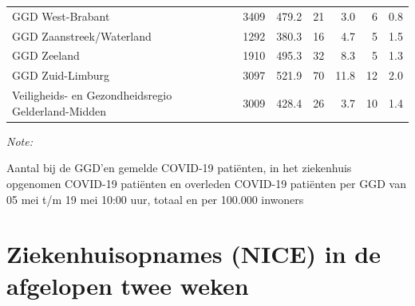 \documentclass[
  english,
  man,floatsintext]{apa6}
\begin{document}
\begin{table}
\begin{threeparttable}
\begin{tabular}{lrrrrrr}
GGD West-Brabant & 3409 & 479.2 & 21 & 3.0 & 6 & 0.8\\
GGD Zaanstreek/Waterland & 1292 & 380.3 & 16 & 4.7 & 5 & 1.5\\
GGD Zeeland & 1910 & 495.3 & 32 & 8.3 & 5 & 1.3\\
GGD Zuid-Limburg & 3097 & 521.9 & 70 & 11.8 & 12 & 2.0\\
Veiligheids- en Gezondheidsregio Gelderland-Midden & 3009 & 428.4 & 26 & 3.7 & 10 & 1.4\\
\bottomrule
\end{tabular}
\begin{tablenotes}
\item \textit{Note: } 
\item Aantal bij de GGD’en gemelde COVID-19 patiënten, in het ziekenhuis opgenomen COVID-19 patiënten en overleden COVID-19 patiënten per GGD van 05 mei t/m 19 mei 10:00 uur, totaal en per 100.000 inwoners
\end{tablenotes}
\end{threeparttable}
\endgroup{}
\end{table}

\newpage

\hypertarget{ziekenhuisopnames-nice-in-de-afgelopen-twee-weken}{%
\section{Ziekenhuisopnames (NICE) in de afgelopen twee weken}\label{ziekenhuisopnames-nice-in-de-afgelopen-twee-weken}}
\end{document}
